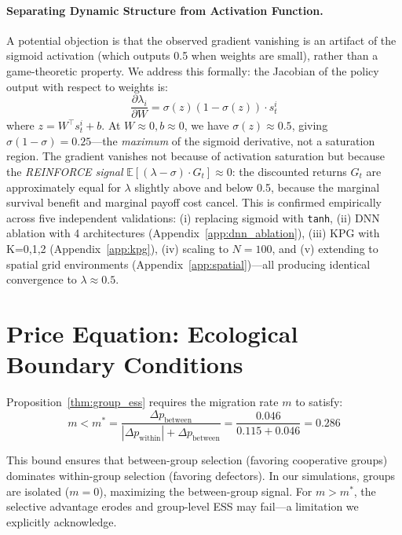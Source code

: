 \documentclass{article}
\begin{document}
\paragraph{Separating Dynamic Structure from Activation Function.}
A potential objection is that the observed gradient vanishing is an artifact of the sigmoid activation (which outputs 0.5 when weights are small), rather than a game-theoretic property.
We address this formally: the Jacobian of the policy output with respect to weights is:
\begin{equation}
\frac{\partial \lambda_i}{\partial W} = \sigma(z)(1-\sigma(z)) \cdot s_t^i
\end{equation}
where $z = W^\top s_t^i + b$.
At $W \approx 0, b \approx 0$, we have $\sigma(z) \approx 0.5$, giving $\sigma(1-\sigma) = 0.25$---the \emph{maximum} of the sigmoid derivative, not a saturation region.
The gradient vanishes not because of activation saturation but because the \emph{REINFORCE signal} $\mathbb{E}[(\lambda - \sigma) \cdot G_t] \approx 0$: the discounted returns $G_t$ are approximately equal for $\lambda$ slightly above and below 0.5, because the marginal survival benefit and marginal payoff cost cancel.
This is confirmed empirically across five independent validations: (i) replacing sigmoid with \texttt{tanh}, (ii) DNN ablation with 4 architectures (Appendix~\ref{app:dnn_ablation}), (iii) KPG with K=0,1,2 (Appendix~\ref{app:kpg}), (iv) scaling to $N=100$, and (v) extending to spatial grid environments (Appendix~\ref{app:spatial})---all producing identical convergence to $\lambda \approx 0.5$.

\section{Price Equation: Ecological Boundary Conditions}
\label{app:price}

Proposition~\ref{thm:group_ess} requires the migration rate $m$ to satisfy:
\begin{equation}
m < m^* = \frac{\Delta p_{\text{between}}}{|\Delta p_{\text{within}}| + \Delta p_{\text{between}}} = \frac{0.046}{0.115 + 0.046} = 0.286
\end{equation}

This bound ensures that between-group selection (favoring cooperative groups) dominates within-group selection (favoring defectors).
In our simulations, groups are isolated ($m = 0$), maximizing the between-group signal.
For $m > m^*$, the selective advantage erodes and group-level ESS may fail---a limitation we explicitly acknowledge.
\end{document}
